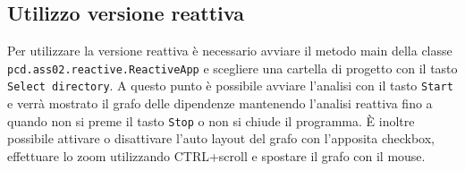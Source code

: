 \documentclass[11pt,notitlepage]{article}
\begin{document}
\subsection{Utilizzo versione reattiva}

Per utilizzare la versione reattiva è necessario avviare il metodo main della classe \\
\texttt{pcd.ass02.reactive.ReactiveApp} e scegliere una cartella di progetto con il tasto \texttt{Select directory}.
A questo punto è possibile avviare l'analisi con il tasto \texttt{Start} e verrà mostrato il grafo delle dipendenze mantenendo l'analisi reattiva fino a quando non si preme 
il tasto \texttt{Stop} o non si chiude il programma.
È inoltre possibile attivare o disattivare l'auto layout del grafo con l'apposita checkbox, effettuare lo zoom utilizzando CTRL+scroll e spostare il grafo con il mouse.
\end{document}
